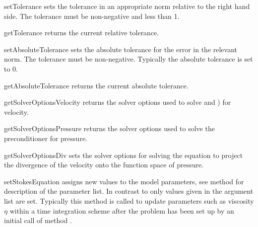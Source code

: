 \begin{methoddesc}[StokesProblemCartesian]{setTolerance}{}
sets the tolerance in an appropriate norm relative to the right hand side.
The tolerance must be non-negative and less than 1.
\end{methoddesc}

\begin{methoddesc}[StokesProblemCartesian]{getTolerance}{}
returns the current relative tolerance.
\end{methoddesc}

\begin{methoddesc}[StokesProblemCartesian]{setAbsoluteTolerance}{}
sets the absolute tolerance for the error in the relevant norm.
The tolerance must be non-negative.
Typically the absolute tolerance is set to 0.
\end{methoddesc}

\begin{methoddesc}[StokesProblemCartesian]{getAbsoluteTolerance}{}
returns the current absolute tolerance.
\end{methoddesc}

\begin{methoddesc}[StokesProblemCartesian]{getSolverOptionsVelocity}{}
returns the solver options used to solve  and ) for velocity.
\end{methoddesc}

\begin{methoddesc}[StokesProblemCartesian]{getSolverOptionsPressure}{}
returns the solver options used to solve the preconditioner  for pressure.
\end{methoddesc}

\begin{methoddesc}[StokesProblemCartesian]{getSolverOptionsDiv}{}
sets the solver options for solving the equation to project the divergence of
the velocity onto the function space of pressure.
\end{methoddesc}

\begin{methoddesc}[StokesProblemCartesian]{setStokesEquation}{}
assigns new values to the model parameters, see method  for description of the 
parameter list. In contrast to  only values given in the argument list are set. 
Typically this method is called to update parameters such as viscosity $\eta$ within a time integration scheme
after the problem has been set up by an initial call of method .
\end{methoddesc}

